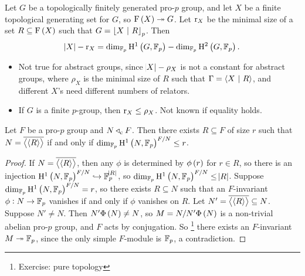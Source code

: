 \begin{theorem}
\label{thm:5.4.28}
Let $ G $ be a topologically finitely generated pro-$ p $ group, and let $ X $ be a finite topological generating set for $ G $, so $ \F\br{X} \twoheadrightarrow G $. Let $ \mathrm{r}_X $ be the minimal size of a set $ R \subseteq \F\br{X} $ such that $ G = \left\lfloor X \ \middle| \  R \right\rfloor_p $. Then
$$ \abs{X} - \r_X = \dim_{\FF_p} \H^1\br{G, \FF_p} - \dim_{\FF_p} \H^2\br{G, \FF_p}. $$
\end{theorem}

\begin{remark}
\hfill
\begin{itemize}
\item Not true for abstract groups, since $ \abs{X} - \rho_X $ is not a constant for abstract groups, where $ \rho_X $ is the minimal size of $ R $ such that $ \Gamma = \left\langle X \ \middle| \  R \right\rangle $, and different $ X $'s need different numbers of relators.
\item If $ G $ is a finite $ p $-group, then $ \mathrm{r}_X \le \rho_X $. Not known if equality holds.
\end{itemize}
\end{remark}

\begin{lemma}
\label{lem:5.4.32}
Let $ F $ be a pro-$ p $ group and $ N \triangleleft_{\mathrm{c}} F $. Then there exists $ R \subseteq F $ of size $ r $ such that $ N = \overline{\left\langle \left\langle R \right\rangle \right\rangle} $ if and only if $ \dim_{\FF_p} \H^1\br{N, \FF_p}^{F / N} \le r $.
\end{lemma}

\begin{proof}
If $ N = \overline{\left\langle \left\langle R \right\rangle \right\rangle} $, then any $ \phi $ is determined by $ \phi\br{r} $ for $ r \in R $, so there is an injection $ \H^1\br{N, \FF_p}^{F / N} \hookrightarrow \FF_p^{\abs{R}} $, so $ \dim_{\FF_p} \H^1\br{N, \FF_p}^{F / N} \le \abs{R} $. Suppose $ \dim_{\FF_p} \H^1\br{N, \FF_p}^{F / N} = r $, so there exists $ R \subseteq N $ such that an $ F $-invariant $ \phi : N \to \mathbb{F}_p $ vanishes if and only if $ \phi $ vanishes on $ R $. Let $ N' = \overline{\left\langle \left\langle R \right\rangle \right\rangle} \subseteq N $. Suppose $ N' \ne N $. Then $ N'\Phi\br{N} \ne N $, so $ M = N / N'\Phi\br{N} $ is a non-trivial abelian pro-$ p $ group, and $ F $ acts by conjugation. So \footnote{Exercise: pure topology} there exists an $ F $-invariant $ M \twoheadrightarrow \mathbb{F}_p $, since the only simple $ F $-module is $ \mathbb{F}_p $, a contradiction.
\end{proof}

